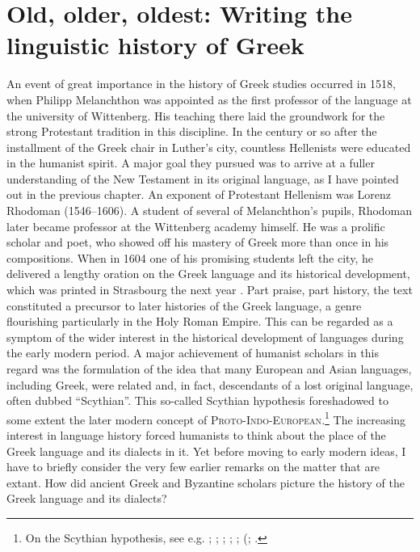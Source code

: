 \chapter{Old, older, oldest: Writing the linguistic history of Greek}\label{chap:5}

An event of great importance in the history of Greek studies occurred in 1518, when Philipp Melanchthon was appointed as the first professor of the language at the university of Wittenberg. His teaching there laid the groundwork for the strong Protestant tradition in this discipline. In the century or so after the installment of the Greek chair in Luther’s city, countless Hellenists were educated in the humanist spirit. A major goal they pursued was to arrive at a fuller understanding of the New Testament in its original language, as I have pointed out in the previous chapter. An exponent of Protestant Hellenism was Lorenz Rhodoman (1546–1606). A student of several of Melanchthon’s pupils, Rhodoman later became professor at the Wittenberg academy himself. He was a prolific scholar and poet, who showed off his mastery of Greek more than once in his compositions. When in 1604 one of his promising students left the city, he delivered a lengthy oration on the Greek language and its historical development, which was printed in Strasbourg the next year \citep{Rhodomanus1605}. Part praise, part history, the text constituted a precursor to later histories of the Greek language, a genre flourishing particularly in the Holy Roman Empire. This can be regarded as a symptom of the wider interest in the historical development of languages during the early modern period. A major achievement of humanist scholars in this regard was the formulation of the idea that many European and Asian languages, including Greek, were related and, in fact, descendants of a lost original language, often dubbed “Scythian”. This so-called Scythian hypothesis foreshadowed to some extent the later modern concept of \textsc{Proto-Indo-European}.\footnote{On the Scythian hypothesis, see e.g. \citet[34--39]{Metcalf2013}; \citet{Droixhe1980}; \citet[]{Swiggers1984, Swiggers1998}; \citet{Villani2003}; \citet{Considine2010}; \citeauthor{VanHal2010b} (\citeyear{VanHal2010b}; \citeyear[esp. 335–401, 473–475]{VanHal2010a}.} The increasing interest in language history forced humanists to think about the place of the Greek language and its dialects in it. Yet before moving to early modern ideas, I have to briefly consider the very few earlier remarks on the matter that are extant. How did ancient Greek and Byzantine scholars picture the history of the Greek language and its dialects?

